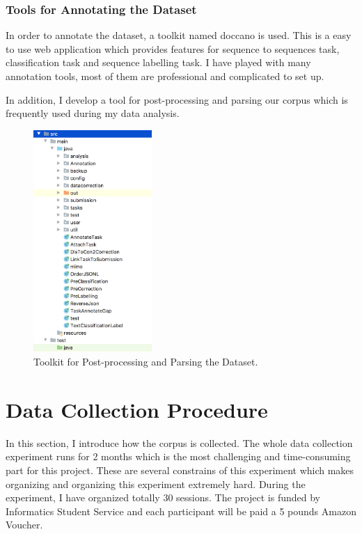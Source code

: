 \documentclass[bsc,frontabs,twoside,singlespacing,parskip,deptreport]{infthesis}     %
\begin{document}
\subsubsection{Tools for Annotating the Dataset}

In order to annotate the dataset, a toolkit named doccano\cite{doccano} is used. This is a easy to use web application which provides features for sequence to sequences task, classification task and sequence labelling task. I have played with many annotation tools, most of them are professional and complicated to set up.

In addition, I develop a tool for post-processing and parsing our corpus which is frequently used during my data analysis.

\begin{figure}[h]
    \centering
    \includegraphics[width=0.4\textwidth]{parser.png}
    \caption{Toolkit for Post-processing and Parsing the Dataset.}
    \label{fig:parser}
\end{figure}



\newpage
\section{Data Collection Procedure}

In this section, I introduce how the corpus is collected. The whole data collection experiment runs for 2 months which is the most challenging and time-consuming part for this project. These are several constrains of this experiment which makes organizing and organizing this experiment extremely hard. During the experiment, I have organized totally 30 sessions. The project is funded by Informatics Student Service and each participant will be paid a 5 pounds Amazon Voucher.
\end{document}
